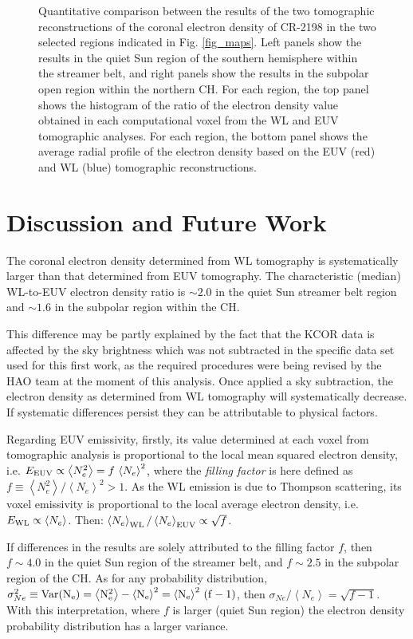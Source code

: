 \documentclass[baaa]{baaa}
\def\Eeuv{E_{\rm{EUV}}}
\def\Ewl{E_{\rm{WL}}}
\def\AvgNE2{\left<N_e^2\right>}
\def\AvgNe{\left<N_e\right>}
\def\SigmaNe{\sigma_{Ne}}
\begin{document}
\begin{figure}[!ht]
  \caption{Quantitative comparison between the results of the two tomographic reconstructions of the coronal electron density of CR-2198 in the two selected regions indicated in Fig. \ref{fig_maps}. Left panels show the results in the quiet {Sun} region of the southern hemisphere within the streamer belt, and right panels show the results in the subpolar open region within the northern CH. For each region, the top panel shows the histogram of the ratio of the electron density value obtained in each computational voxel from the WL and EUV tomographic {analyses}. For each region, the bottom panel shows the average radial profile of the electron density based on the EUV (red) and WL (blue) tomographic reconstructions.}
  \label{fig_analysis}
\end{figure}

\section{Discussion and Future Work}

The coronal electron density determined from WL tomography is systematically larger than that determined from EUV tomography. The characteristic (median) WL-to-EUV electron density ratio is $\sim 2.0$ in the quiet {Sun} streamer belt region and $\sim 1.6$ in the subpolar region within the CH.

This difference may be partly explained by the fact that the KCOR data is affected by the sky brightness which was not subtracted in the specific data set used for this first work, as the required procedures were being revised by the HAO team at the moment of this analysis. Once applied a sky subtraction, the electron density as determined from WL tomography will systematically decrease. If systematic differences persist they can be attributable to physical factors. 

{Regarding EUV emissivity, firstly, its value determined} at each voxel from tomographic analysis is proportional to the local mean squared electron density, i.e. $\Eeuv \propto \AvgNE2 = f\,\AvgNe^2$, where the \emph{filling factor} is here defined as $f\equiv\AvgNE2 / \AvgNe^2 > 1$. As the WL emission is due to Thompson scattering, its voxel emissivity is proportional to the local average electron density, i.e. $\Ewl \propto \AvgNe$. Then: $\AvgNe_{\rm{WL}} / \AvgNe_{\rm{EUV}} \propto \sqrt{f}$. 

If differences in the results are solely attributed to the filling factor $f$, then $f\sim 4.0$ in the quiet Sun region of the streamer belt, and $f\sim 2.5$ in the subpolar region of the CH. As for any probability distribution, $\SigmaNe^2 \equiv \rm{Var}(N_e) = \AvgNE2 - \AvgNe^2 = \AvgNe^2 \, (f-1)$, then $\SigmaNe / \AvgNe = \sqrt{f-1}$. With this interpretation, where $f$ is larger (quiet {Sun} region) the electron density probability distribution has a larger variance.
\end{document}
